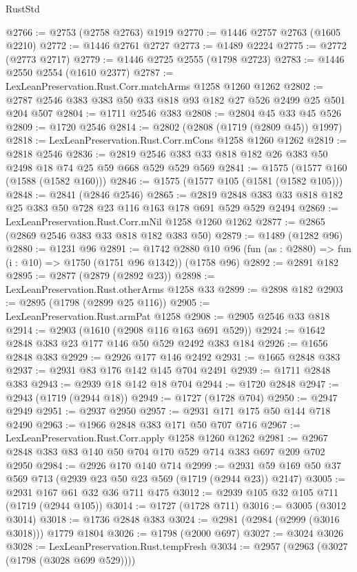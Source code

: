 \begin{lexlean}{RustStd}
\begin{coremodule}
{\begin{coremodule}
{{{{{{{{{{{{@2766 := @2753 (@2758 @2763) @1919
@2770 := @1446 @2757 @2763 (@1605 @2210)
@2772 := @1446 @2761 @2727
@2773 := @1489 @2224
@2775 := @2772 (@2773 @2717)
@2779 := @1446 @2725 @2555 (@1798 @2723)
@2783 := @1446 @2550 @2554 (@1610 @2377)
@2787 := LexLeanPreservation.Rust.Corr.matchArms @1258 @1260 @1262
@2802 := @2787 @2546 @383 @383 @50 @33 @818 @93 @182 @27 @526 @2499 @25 @501 @204 @507
@2804 := @1711 @2546 @383
@2808 := @2804 @45 @33 @45 @526
@2809 := @1720 @2546
@2814 := @2802 (@2808 (@1719 (@2809 @45)) @1997)
@2818 := LexLeanPreservation.Rust.Corr.mCons @1258 @1260 @1262
@2819 := @2818 @2546
@2836 := @2819 @2546 @383 @33 @818 @182 @26 @383 @50 @2498 @18 @74 @25 @59 @668 @529 @529 @569
@2841 := @1575 (@1577 @160 (@1588 (@1582 @160)))
@2846 := @1575 (@1577 @105 (@1581 (@1582 @105)))
@2848 := @2841 (@2846 @2546)
@2865 := @2819 @2848 @383 @33 @818 @182 @25 @383 @50 @728 @23 @116 @163 @178 @691 @529 @529 @2494
@2869 := LexLeanPreservation.Rust.Corr.mNil @1258 @1260 @1262
@2877 := @2865 (@2869 @2546 @383 @33 @818 @182 @383 @50)
@2879 := @1489 (@1282 @96)
@2880 := @1231 @96
@2891 := @1742
    @2880
    @10
    @96
    (fun (as : @2880) => fun (i : @10) => @1750 (@1751 @96 @1342))
    (@1758 @96)
@2892 := @2891 @182
@2895 := @2877 (@2879 (@2892 @23))
@2898 := LexLeanPreservation.Rust.otherArms @1258 @33
@2899 := @2898 @182
@2903 := @2895 (@1798 (@2899 @25 @116))
@2905 := LexLeanPreservation.Rust.armPat @1258
@2908 := @2905 @2546 @33 @818
@2914 := @2903 (@1610 (@2908 @116 @163 @691 @529))
@2924 := @1642 @2848 @383 @23 @177 @146 @50 @529 @2492 @383 @184
@2926 := @1656 @2848 @383
@2929 := @2926 @177 @146 @2492
@2931 := @1665 @2848 @383
@2937 := @2931 @83 @176 @142 @145 @704 @2491
@2939 := @1711 @2848 @383
@2943 := @2939 @18 @142 @18 @704
@2944 := @1720 @2848
@2947 := @2943 (@1719 (@2944 @18))
@2949 := @1727 (@1728 @704)
@2950 := @2947 @2949
@2951 := @2937 @2950
@2957 := @2931 @171 @175 @50 @144 @718 @2490
@2963 := @1966 @2848 @383 @171 @50 @707 @716
@2967 := LexLeanPreservation.Rust.Corr.apply @1258 @1260 @1262
@2981 := @2967 @2848 @383 @83 @140 @50 @704 @170 @529 @714 @383 @697 @209 @702 @2950
@2984 := @2926 @170 @140 @714
@2999 := @2931 @59 @169 @50 @37 @569 @713 (@2939 @23 @50 @23 @569 (@1719 (@2944 @23)) @2147)
@3005 := @2931 @167 @61 @32 @36 @711 @475
@3012 := @2939 @105 @32 @105 @711 (@1719 (@2944 @105))
@3014 := @1727 (@1728 @711)
@3016 := @3005 (@3012 @3014)
@3018 := @1736 @2848 @383
@3024 := @2981 (@2984 (@2999 (@3016 @3018))) @1779 @1804
@3026 := @1798 (@2000 @697)
@3027 := @3024 @3026
@3028 := LexLeanPreservation.Rust.tempFresh
@3034 := @2957 (@2963 (@3027 (@1798 (@3028 @699 @529))))
}}}}}}}}}}}}
\end{coremodule}}
\end{coremodule}
\end{lexlean}
